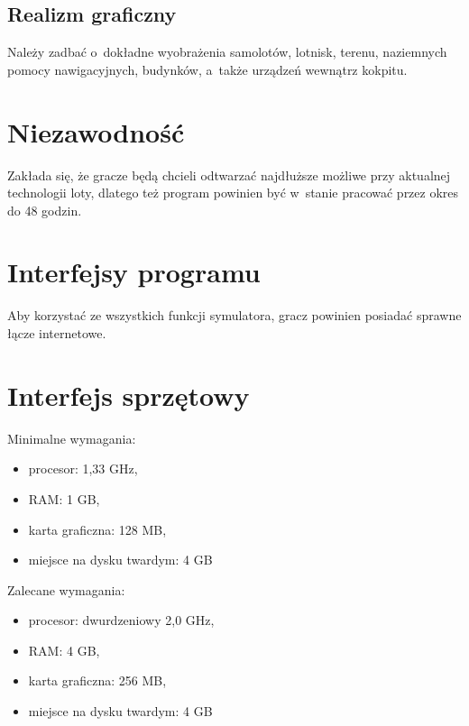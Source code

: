 \documentclass{mwrep}
\begin{document}
\subsection{Realizm graficzny}
Należy zadbać o~dokładne wyobrażenia samolotów, lotnisk, terenu, naziemnych pomocy nawigacyjnych, budynków, a~także urządzeń \linebreak wewnątrz kokpitu.

\section{Niezawodność}
Zakłada się, że gracze będą chcieli odtwarzać najdłuższe możliwe przy aktualnej technologii loty, dlatego też program powinien być w~stanie pracować przez okres do 48 godzin.

\section{Interfejsy programu}
Aby korzystać ze wszystkich funkcji symulatora, gracz powinien posiadać sprawne łącze internetowe.

\section{Interfejs sprzętowy}
Minimalne wymagania:
\begin{itemize}
\item procesor: 1,33 GHz,
\item RAM: 1 GB,
\item karta graficzna: 128 MB,
\item miejsce na dysku twardym: 4 GB
\end{itemize}
\vspace{1ex}
Zalecane wymagania:
\begin{itemize}
\item procesor: dwurdzeniowy 2,0 GHz,
\item RAM: 4 GB,
\item karta graficzna: 256 MB,
\item miejsce na dysku twardym: 4 GB
\end{itemize}
\end{document}

